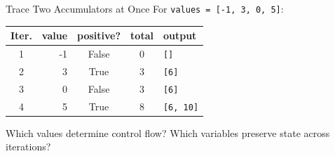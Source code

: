 \documentclass[aspectratio=169,10pt]{beamer}
\begin{document}
\begin{frame}{Trace Two Accumulators at Once}
  For \texttt{values = [-1, 3, 0, 5]}:

  \begin{center}
    \renewcommand{\arraystretch}{1.2}
    \begin{tabular}{c|r|c|c|l}
      \textbf{Iter.} & \textbf{value} & \textbf{positive?} & \textbf{total} & \textbf{output} \\\hline
      1 & -1 & False & 0 & \texttt{[]} \\
      2 & 3 & True & 3 & \texttt{[6]} \\
      3 & 0 & False & 3 & \texttt{[6]} \\
      4 & 5 & True & 8 & \texttt{[6, 10]}
    \end{tabular}
  \end{center}

  \begin{activity}
    Which values determine control flow? Which variables preserve state across iterations?
  \end{activity}
\end{frame}


\end{document}
